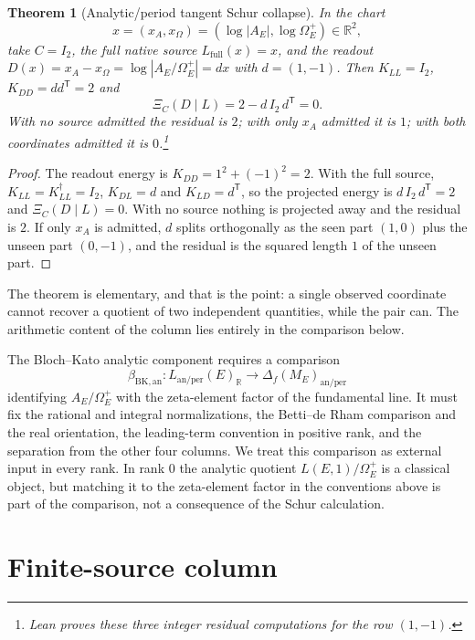 \documentclass[11pt]{article}
\newtheorem{theorem}{Theorem}[section]
\theoremstyle{definition}
\newcommand{\R}{\mathbb{R}}
\newcommand{\XiC}{\Xi_C(D\mid L)}        \newcommand{\KDD}{K_{DD}}
\newcommand{\KDL}{K_{DL}}
\newcommand{\KLL}{K_{LL}}
\newcommand{\Kdagger}{K_{LL}^{\dagger}}  \newcommand{\vsrc}{\mathrm{vsrc}}        \newcommand{\Jone}{J_1}
\begin{document}
\begin{theorem}[Analytic/period tangent Schur collapse]\label{thm:apparatus:analytic-period-schur-collapse}
In the chart
\[
  x=(x_A,x_\Omega)=(\log|A_E|,\log\Omega_E^+)\in\R^2,
\]
take $C=I_2$, the full native source $L_{\mathrm{full}}(x)=x$, and the
readout $D(x)=x_A-x_\Omega=\log|A_E/\Omega_E^+|=dx$ with $d=(1,-1)$.  Then $\KLL=I_2$,
$\KDD=dd^{\mathsf T}=2$ and
\[
  \XiC=2-d\,I_2\,d^{\mathsf T}=0.
\]
With no source admitted the residual is $2$; with only $x_A$ admitted it
is $1$; with both coordinates admitted it is $0$.\footnote{Lean proves these three integer residual computations for the
row $(1,-1)$.}
\end{theorem}

\begin{proof}
The readout energy is $\KDD=1^2+(-1)^2=2$.  With the full source,
$\KLL=\Kdagger=I_2$, $\KDL=d$ and $K_{LD}=d^{\mathsf T}$, so the projected
energy is $d\,I_2\,d^{\mathsf T}=2$ and $\XiC=0$.  With no source nothing is
projected away and the residual is $2$.  If only $x_A$ is admitted, $d$
splits orthogonally as the seen part $(1,0)$ plus the unseen part
$(0,-1)$, and the residual is the squared length $1$ of the unseen part.
\end{proof}

The theorem is elementary, and that is the point: a single observed
coordinate cannot recover a quotient of two independent quantities,
while the pair can.  The arithmetic content of the column lies entirely in
the comparison below.

\begin{obligation}\label{obl:apparatus:rho-an-period-transport}
The Bloch--Kato analytic component requires a comparison
\[
  \beta_{\mathrm{BK,an}}:
  L_{\mathrm{an/per}}(E)_{\R}
  \longrightarrow
  \Delta_f(M_E)_{\mathrm{an/per}}
\]
identifying $A_E/\Omega_E^+$ with the zeta-element factor of the
fundamental line.  It must fix the rational and integral normalizations,
the Betti--de Rham comparison and the real orientation, the leading-term
convention in positive rank, and the separation from the other four
columns.  We treat this comparison as external input in every rank.  In
rank $0$ the analytic quotient $L(E,1)/\Omega_E^+$ is a classical object,
but matching it to the zeta-element factor in the conventions above is
part of the comparison, not a consequence of the Schur calculation.
\end{obligation}
 \section{Finite-source column}
\label{sec:finite-source}
\end{document}
